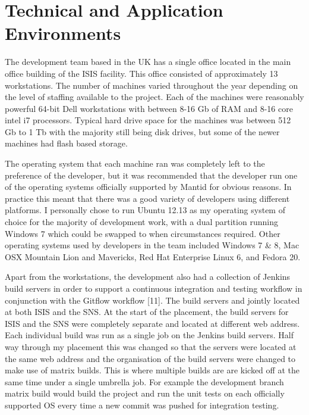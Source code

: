 \documentclass[paper=a4, fontsize=11pt]{scrartcl}	%
\numberwithin{equation}{section}															%
\numberwithin{figure}{section}																%
\numberwithin{table}{section}
\begin{document}
\section{Technical and Application
Environments}\label{technical-and-application-environments}

The development team based in the UK has a single office located in the
main office building of the ISIS facility. This office consisted of
approximately 13 workstations. The number of machines varied throughout
the year depending on the level of staffing available to the project.
Each of the machines were reasonably powerful 64-bit Dell workstations
with between 8-16 Gb of RAM and 8-16 core intel i7 processors. Typical
hard drive space for the machines was between 512 Gb to 1 Tb with the
majority still being disk drives, but some of the newer machines had
flash based storage.

The operating system that each machine ran was completely left to the
preference of the developer, but it was recommended that the developer
run one of the operating systems officially supported by Mantid for
obvious reasons. In practice this meant that there was a good variety of
developers using different platforms. I personally chose to run Ubuntu
12.13 as my operating system of choice for the majority of development
work, with a dual partition running Windows 7 which could be swapped to
when circumstances required. Other operating systems used by developers
in the team included Windows 7 \& 8, Mac OSX Mountain Lion and
Mavericks, Red Hat Enterprise Linux 6, and Fedora 20.

Apart from the workstations, the development also had a collection of
Jenkins build servers in order to support a continuous integration and
testing workflow in conjunction with the Gitflow workflow {[}11{]}. The
build servers and jointly located at both ISIS and the SNS. At the start
of the placement, the build servers for ISIS and the SNS were completely
separate and located at different web address. Each individual build was
run as a single job on the Jenkins build servers. Half way through my
placement this was changed so that the servers were located at the same
web address and the organisation of the build servers were changed to
make use of matrix builds. This is where multiple builds are are kicked
off at the same time under a single umbrella job. For example the
development branch matrix build would build the project and run the unit
tests on each officially supported OS every time a new commit was pushed
for integration testing.
\end{document}
